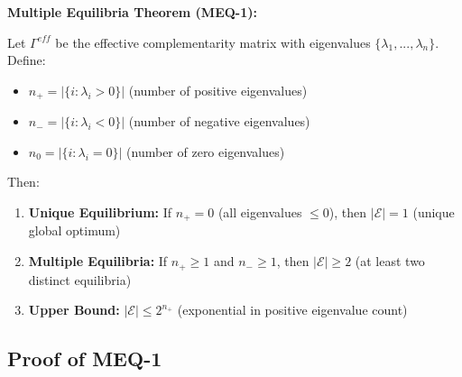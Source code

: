 \begin{tcolorbox}[colback=red!5!white, colframe=red!75!black,
    title=Theorem MEQ-1: Existence of Multiple Equilibria]

\textbf{Multiple Equilibria Theorem (MEQ-1):}

Let $\Gamma^{eff}$ be the effective complementarity matrix with eigenvalues
$\{\lambda_1, ..., \lambda_n\}$. Define:
\begin{itemize}[nosep]
    \item $n_+ = |\{i : \lambda_i > 0\}|$ (number of positive eigenvalues)
    \item $n_- = |\{i : \lambda_i < 0\}|$ (number of negative eigenvalues)
    \item $n_0 = |\{i : \lambda_i = 0\}|$ (number of zero eigenvalues)
\end{itemize}

Then:

\begin{enumerate}
    \item \textbf{Unique Equilibrium:} If $n_+ = 0$ (all eigenvalues $\leq 0$),
          then $|\mathcal{E}| = 1$ (unique global optimum)

    \item \textbf{Multiple Equilibria:} If $n_+ \geq 1$ and $n_- \geq 1$, then
          $|\mathcal{E}| \geq 2$ (at least two distinct equilibria)

    \item \textbf{Upper Bound:} $|\mathcal{E}| \leq 2^{n_+}$ (exponential in
          positive eigenvalue count)
\end{enumerate}

\end{tcolorbox}

\subsection{Proof of MEQ-1}

